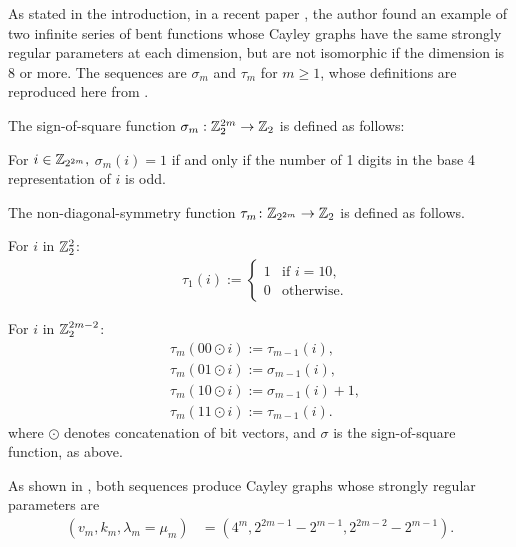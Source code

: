As stated in the introduction, in a recent paper \cite{Leo17Hurwitz},
the author found an example of two infinite series of bent functions whose
Cayley graphs have the same strongly regular parameters at each dimension,
but are not isomorphic if the dimension is 8 or more.
The sequences are $\sigma_m$ and $\tau_m$ for $m \geqslant 1$,
whose definitions are reproduced here from \cite{Leo15Twin}.

\begin{definition}
\label{def-sigma-tau}
The sign-of-square function $\sigma_m : \mathbb{Z}_2^{2 m} \rightarrow \mathbb{Z}_2$ is defined as follows:

For $i \in \mathbb{Z}_{2^{2m}},$ $\sigma_m(i) = 1$ if and only if the number of
1 digits in the base 4 representation of $i$ is odd.

The non-diagonal-symmetry function $\tau_m \colon \mathbb{Z}_{2^{2 m}} \rightarrow \mathbb{Z}_2$
is defined as follows.

For $i$ in $\mathbb{Z}_2^2$:
\begin{align*}
&\tau_1(i) :=
\begin{cases}
1 &\text{if~}i = 10,
\\
0 &\text{otherwise}.
\end{cases}
\end{align*}

For $i$ in $\mathbb{Z}_2^{2 m - 2}$:
\begin{align*}
&\tau_m (00 \odot i) := \tau_{m-1}(i),
\\
&\tau_m (01 \odot i) := \sigma_{m-1}(i),
\\
&\tau_m (10 \odot i) := \sigma_{m-1}(i) + 1,
\\
&\tau_m (11 \odot i) := \tau_{m-1}(i).
\end{align*}
where $\odot$ denotes concatenation of bit vectors, and $\sigma$ is the sign-of-square function, as above.
\end{definition}

As shown in  \cite{Leo15Twin}, both sequences produce Cayley graphs whose strongly regular parameters are
\begin{align*}
(v_m,k_m,\lambda_m=\mu_m) &= (4^m, 2^{2 m - 1} - 2^{m-1}, 2^{2 m - 2} - 2^{m-1}).
\end{align*}


